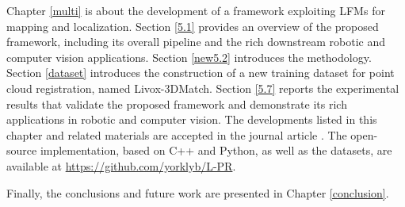 \par
Chapter \ref{multi} is about the development of a framework exploiting LFMs for mapping and localization.
%
Section \ref{5.1} provides an overview of the proposed framework, including its overall pipeline and the rich downstream robotic and computer vision applications. Section \ref{new5.2} introduces the methodology.
Section \ref{dataset} introduces the construction of a new training dataset for point cloud registration, named Livox-3DMatch. Section \ref{5.7} reports the experimental results that validate the proposed framework and demonstrate its rich applications in robotic and computer vision. The developments listed in this chapter and related materials are accepted in the journal article \cite{lpr}. 
%
The open-source implementation, based on C++ and Python, as well as the datasets, are available at \url{https://github.com/yorklyb/L-PR}.
\par
Finally, the conclusions and future work are presented in Chapter \ref{conclusion}.
